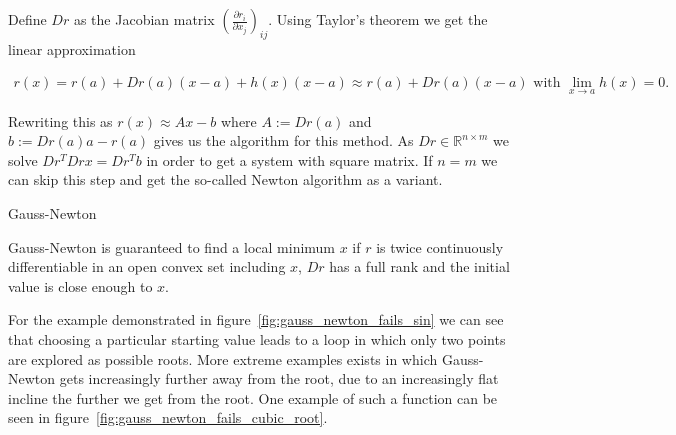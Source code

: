 Define $Dr$ as the Jacobian matrix $\left(\frac{\partial r_i}{\partial x_j}\right)_{ij}$. Using Taylor's theorem we get the linear approximation

\begin{align*}
	r(x) = r(a) + Dr(a)(x-a) + h(x)(x-a) \approx r(a) + Dr(a)(x-a) \text{ with } \lim\limits_{x\rightarrow a}h(x) = 0.
\end{align*}

Rewriting this as $r(x) \approx Ax - b$ where $A := Dr(a)$ and $b := Dr(a)a-r(a)$ gives us the algorithm for this method. As $Dr \in \mathbb{R}^{n\times m}$ we solve $Dr^T Dr x = Dr^T b$ in order to get a system with square matrix. If $n=m$ we can skip this step and get the so-called Newton algorithm as a variant.

\begin{algorithm}[H] \label{alg:gauss_newton}
	\SetAlgoLined
	\DontPrintSemicolon
	\LinesNumbered
	\caption{Gauss-Newton}
	
	\BlankLine
\end{algorithm}

Gauss-Newton is guaranteed to find a local minimum $x$ if $r$ is twice continuously differentiable in an open convex set including $x$, $Dr$ has a full rank and the initial value is close enough to $x$.

For the example demonstrated in figure~\ref{fig:gauss_newton_fails_sin} we can see that choosing a particular starting value leads to a loop in which only two points are explored as possible roots. More extreme examples exists in which Gauss-Newton gets increasingly further away from the root, due to an increasingly flat incline the further we get from the root. One example of such a function can be seen in figure~\ref{fig:gauss_newton_fails_cubic_root}.

